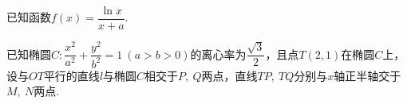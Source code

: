 \documentclass{BHCexam}
\begin{document}
\begin{questions}
	\qs 已知函数$f(x)=\dfrac{\ln x}{x+a}$.
	\qs 已知椭圆$C:\dfrac{x^2}{a^2}+\dfrac{y^2}{b^2}=1~(a>b>0)$的离心率为$ \dfrac{\sqrt{3}}{2} $，且点$ T\left(2,1\right) $在椭圆$ C $上，设与$ OT $平行的直线$l$与椭圆$ C $相交于$ P,~Q $两点，直线$ TP,~TQ $分别与$x$轴正半轴交于$ M,~N $两点.





	\end{questions}
\end{document}
